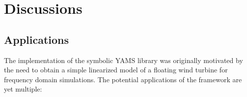 \documentclass[wes, manuscript]{copernicus}
\begin{document}
\section{Discussions}


\subsection{Applications}
\label{sec:Applications}
The implementation of the symbolic YAMS library was originally motivated by the need to obtain a simple linearized model of a floating wind turbine for frequency domain simulations.
The potential applications of the framework are yet multiple:
\end{document}
